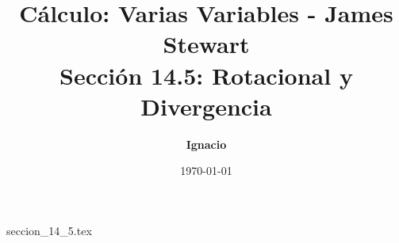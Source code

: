 \documentclass[11pt,spanish,oneside]{report}
\title{\textbf{Cálculo: Varias Variables - James Stewart} \\ \Large Sección 14.5: Rotacional y Divergencia}
\author{\textbf{Ignacio}}
\date{\today}
\begin{document}
\maketitle

{seccion_14_5.tex}
\end{document}
